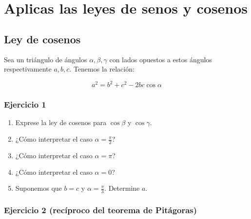 \chapter{Aplicas las leyes de senos y cosenos}

\section{Ley de cosenos}

Sea un triángulo de ángulos $\alpha, \beta, \gamma$ con lados opuestos a estos
ángulos respectivamente $a,b,c$. Tenemos la relación:

$$a^2 = b^2 + c^2 - {2bc \cos\alpha}$$

\begin{center}
\end{center}

\subsection{Ejercicio 1}

\begin{enumerate}
\item Exprese la ley de cosenos para $\cos \beta$ y $\cos \gamma$.
\item ¿Cómo interpretar el caso $\alpha = \frac{\pi}{2}$?
\item ¿Cómo interpretar el caso $\alpha = \pi$?
\item ¿Cómo interpretar el caso $\alpha = 0$?
\item Suponemos que $b = c$ y $\alpha = \frac{\pi}{3}$. Determine $a$.
\end{enumerate}

\subsection{Ejercicio 2 (recíproco del teorema de Pitágoras)}

